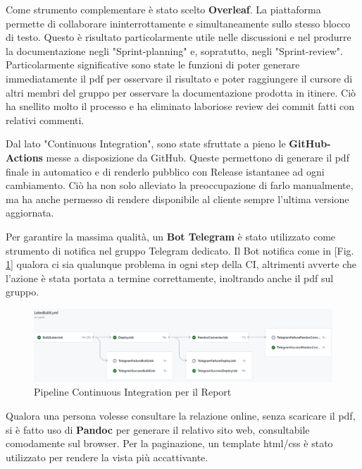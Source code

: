         Come strumento complementare è stato scelto \textbf{Overleaf}. La piattaforma permette di collaborare ininterrottamente e simultaneamente sullo stesso blocco di testo. Questo è risultato particolarmente utile nelle discussioni e nel produrre la documentazione negli "Sprint-planning" e, sopratutto, negli "Sprint-review". Particolarmente significative sono state le funzioni di poter generare immediatamente il pdf per osservare il risultato e poter raggiungere il cursore di altri membri del gruppo per osservare la documentazione prodotta in itinere. Ciò ha snellito molto il processo e ha eliminato laboriose review dei commit fatti con relativi commenti.  

        Dal lato "Continuous Integration", sono state sfruttate a pieno le \textbf{GitHub-Actions} messe a disposizione da GitHub. Queste permettono di generare il pdf finale in automatico e di renderlo pubblico con Release istantanee ad ogni cambiamento. Ciò ha non solo alleviato la preoccupazione di farlo manualmente, ma ha anche permesso di rendere disponibile al cliente sempre l'ultima versione aggiornata. 

        Per garantire la massima qualità, un \textbf{Bot Telegram} è stato utilizzato come strumento di notifica nel gruppo Telegram dedicato. Il Bot notifica come in [Fig. \ref{fig:CI-Report}] qualora ci sia qualunque problema in ogni step della CI, altrimenti avverte che l'azione è stata portata a termine correttamente, inoltrando anche il pdf sul gruppo. 

        \begin{figure}[H]
            \caption{Pipeline Continuous Integration per il Report}
            \label{fig:CI-Report}
            \centering
            \includegraphics[width=1\textwidth]{Images/CI-Report.png}
        \end{figure}

        Qualora una persona volesse consultare la relazione online, senza scaricare il pdf, si è fatto uso di \textbf{Pandoc} per generare il relativo sito web, consultabile comodamente sul browser. Per la paginazione, un template html/css è stato utilizzato per rendere la vista più accattivante.


